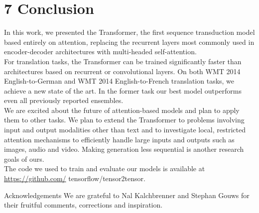 \documentclass[10pt]{article}
\begin{document}
\section*{7 Conclusion}
In this work, we presented the Transformer, the first sequence transduction model based entirely on attention, replacing the recurrent layers most commonly used in encoder-decoder architectures with multi-headed self-attention.\\
For translation tasks, the Transformer can be trained significantly faster than architectures based on recurrent or convolutional layers. On both WMT 2014 English-to-German and WMT 2014 English-to-French translation tasks, we achieve a new state of the art. In the former task our best model outperforms even all previously reported ensembles.\\
We are excited about the future of attention-based models and plan to apply them to other tasks. We plan to extend the Transformer to problems involving input and output modalities other than text and to investigate local, restricted attention mechanisms to efficiently handle large inputs and outputs such as images, audio and video. Making generation less sequential is another research goals of ours.\\
The code we used to train and evaluate our models is available at \href{https://github.com/}{https://github.com/} tensorflow/tensor2tensor.

Acknowledgements We are grateful to Nal Kalchbrenner and Stephan Gouws for their fruitful comments, corrections and inspiration.
\end{document}
